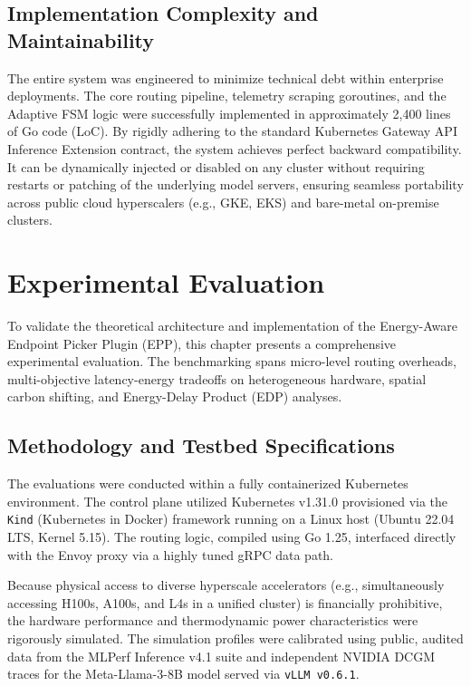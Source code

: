 \documentclass[12pt,a4paper,oneside]{report}
\begin{document}
\section{Implementation Complexity and Maintainability}
\label{sec:impl_complexity}

The entire system was engineered to minimize technical debt within enterprise deployments. The core routing pipeline, telemetry scraping goroutines, and the Adaptive FSM logic were successfully implemented in approximately 2,400 lines of Go code (LoC). By rigidly adhering to the standard Kubernetes Gateway API Inference Extension contract, the system achieves perfect backward compatibility. It can be dynamically injected or disabled on any cluster without requiring restarts or patching of the underlying model servers, ensuring seamless portability across public cloud hyperscalers (e.g., GKE, EKS) and bare-metal on-premise clusters.


\chapter{Experimental Evaluation}
\label{ch:evaluation}

To validate the theoretical architecture and implementation of the Energy-Aware Endpoint Picker Plugin (EPP), this chapter presents a comprehensive experimental evaluation. The benchmarking spans micro-level routing overheads, multi-objective latency-energy tradeoffs on heterogeneous hardware, spatial carbon shifting, and Energy-Delay Product (EDP) analyses. 

\section{Methodology and Testbed Specifications}
\label{sec:eval_methodology}

The evaluations were conducted within a fully containerized Kubernetes environment. The control plane utilized Kubernetes v1.31.0 provisioned via the \texttt{Kind} (Kubernetes in Docker) framework running on a Linux host (Ubuntu 22.04 LTS, Kernel 5.15). The routing logic, compiled using Go 1.25, interfaced directly with the Envoy proxy via a highly tuned gRPC data path.

Because physical access to diverse hyperscale accelerators (e.g., simultaneously accessing H100s, A100s, and L4s in a unified cluster) is financially prohibitive, the hardware performance and thermodynamic power characteristics were rigorously simulated. The simulation profiles were calibrated using public, audited data from the MLPerf Inference v4.1 suite and independent NVIDIA DCGM traces for the Meta-Llama-3-8B model served via \texttt{vLLM v0.6.1}.
\end{document}
